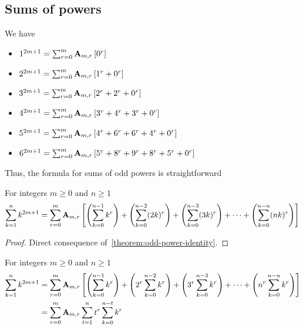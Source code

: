 \subsection{Sums of powers}
\label{subsec:sums-of-powers}
We have
\begin{itemize}
    \item $1^{2m+1} = \sum_{r=0}^{m} {\mathbf{A}} \sb{m,r} \left[ 0^r  \right]$
    \item $2^{2m+1} = \sum_{r=0}^{m} {\mathbf{A}} \sb{m,r} \left[ 1^r + 0^r  \right]$
    \item $3^{2m+1} = \sum_{r=0}^{m} {\mathbf{A}} \sb{m,r} \left[ 2^r + 2^r + 0^r  \right]$
    \item $4^{2m+1} = \sum_{r=0}^{m} {\mathbf{A}} \sb{m,r} \left[ 3^r + 4^r + 3^r + 0^r  \right]$
    \item $5^{2m+1} = \sum_{r=0}^{m} {\mathbf{A}} \sb{m,r} \left[ 4^r + 6^r + 6^r + 4^r + 0^r  \right]$
    \item $6^{2m+1} = \sum_{r=0}^{m} {\mathbf{A}} \sb{m,r} \left[ 5^r + 8^r + 9^r + 8^r + 5^r + 0^r  \right]$
\end{itemize}
Thus, the formula for sums of odd powers is straightforward
\begin{proposition}
    \label{prop:sums-of-odd-powers}
    For integers $m\geq 0$ and $n \geq 1$
    \begin{align*}
        \sum_{k=1}^{n} k^{2m+1}
        = \sum_{r=0}^{m} {\mathbf{A}} \sb{m,r} \left[ \left( \sum_{k=0}^{n-1} k^r \right) +  \left( \sum_{k=0}^{n-2} (2k)^r \right) + \left( \sum_{k=0}^{n-3} (3k)^r \right)+ \cdots + \left( \sum_{k=0}^{n-n} (nk)^r \right) \right]
    \end{align*}
    \begin{proof}
        Direct consequence of~\eqref{theorem:odd-power-identity}.
    \end{proof}
\end{proposition}
\begin{corollary}
    \label{prop:sums-of-odd-powers-rearranged}
    For integers $m\geq 0$ and $n \geq 1$
    \begin{align*}
        \sum_{k=1}^{n} k^{2m+1}
        &= \sum_{r=0}^{m} {\mathbf{A}} \sb{m,r} \left[ \left( \sum_{k=0}^{n-1} k^r \right) +  \left( 2^r \sum_{k=0}^{n-2} k^r \right) + \left( 3^r \sum_{k=0}^{n-3} k^r \right)+ \cdots + \left( n^r \sum_{k=0}^{n-n} k^r \right) \right] \\
        &= \sum_{r=0}^{m} {\mathbf{A}} \sb{m,r} \sum_{t=1}^{n} t^r \sum_{k=0}^{n-t} k^r
    \end{align*}
\end{corollary}

